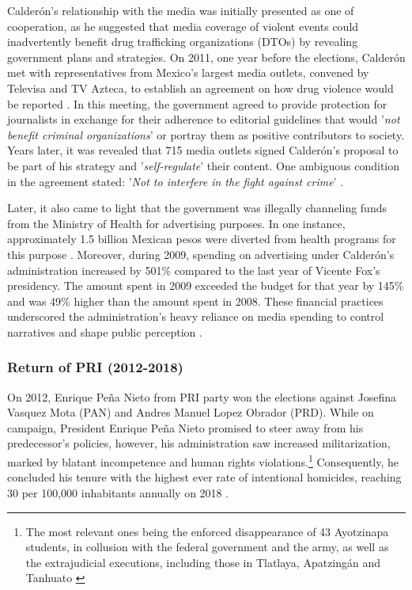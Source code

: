 Calderón's relationship with the media was initially presented as one of cooperation, as he suggested that media coverage of violent events could inadvertently benefit drug trafficking organizations (DTOs) by revealing government plans and strategies. On 2011, one year before the elections, Calderón met with representatives from Mexico's largest media outlets, convened by Televisa and TV Azteca, to establish an agreement on how drug violence would be reported \citep{Callaron-Jornada}. In this meeting, the government agreed to provide protection for journalists in exchange for their adherence to editorial guidelines that would '\textit{not benefit criminal organizations}' or portray them as positive contributors to society. Years later, it was revealed that 715 media outlets signed Calderón's proposal to be part of his strategy and '\textit{self-regulate}' their content. One ambiguous condition in the agreement stated: '\textit{Not to interfere in the fight against crime}' \citep{Callaron-Proceso}.

Later, it also came to light that the government was illegally channeling funds from the Ministry of Health for advertising purposes. In one instance, approximately 1.5 billion Mexican pesos were diverted from health programs for this purpose \citep{Contralinea-Desvio}. Moreover, during 2009, spending on advertising under Calderón's administration increased by 501\% compared to the last year of Vicente Fox's presidency. The amount spent in 2009 exceeded the budget for that year by 145\% and was 49\% higher than the amount spent in 2008. These financial practices underscored the administration's heavy reliance on media spending to control narratives and shape public perception \citep{Fundar}.

\subsubsection*{Return of PRI (2012-2018)}

On 2012, Enrique Peña Nieto from PRI party won the elections against Josefina Vasquez Mota (PAN) and Andres Manuel Lopez Obrador (PRD). While on campaign, President Enrique Peña Nieto promised to steer away from his predecessor's policies, however, his administration saw increased militarization, marked by blatant incompetence and human rights violations.\footnote{The most relevant ones being the enforced disappearance of 43 Ayotzinapa students, in collusion with the federal government and the army, as well as the extrajudicial executions, including those in Tlatlaya, Apatzingán and Tanhuato \citep{Amnesty-Int}} Consequently, he concluded his tenure with the highest ever rate of intentional homicides, reaching 30 per 100,000 inhabitants annually on 2018 \citep{Intentional-Homicides}.

